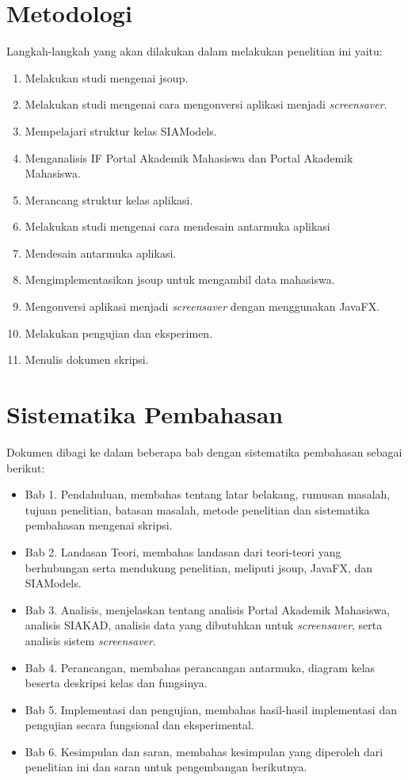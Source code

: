 \section{Metodologi}
\label{sec:metlit}
Langkah-langkah yang akan dilakukan dalam melakukan penelitian ini yaitu:
	\begin{enumerate}
		\item Melakukan studi mengenai jsoup.
		\item Melakukan studi mengenai cara mengonversi aplikasi menjadi \textit{screensaver}.
		\item Mempelajari struktur kelas SIAModels.
		\item Menganalisis IF Portal Akademik Mahasiswa dan Portal Akademik Mahasiswa.
		\item Merancang struktur kelas aplikasi.
		\item Melakukan studi mengenai cara mendesain antarmuka aplikasi
	    \item Mendesain antarmuka aplikasi.
	    \item Mengimplementasikan jsoup untuk mengambil data mahasiswa.
        \item Mengonversi aplikasi menjadi \textit{screensaver} dengan menggunakan JavaFX. 
		\item Melakukan pengujian dan eksperimen.
		\item Menulis dokumen skripsi.
	\end{enumerate}

\section{Sistematika Pembahasan}
\label{sec:sispem}
Dokumen dibagi ke dalam beberapa bab dengan sistematika pembahasan sebagai berikut:
    \begin{itemize}
        \item Bab 1. Pendahuluan, membahas tentang latar belakang, rumusan masalah, tujuan penelitian, batasan masalah, metode penelitian dan sistematika pembahasan mengenai skripsi.
        \item Bab 2. Landasan Teori, membahas landasan dari teori-teori yang berhubungan serta mendukung penelitian, meliputi jsoup, JavaFX, dan SIAModels. 
        \item Bab 3. Analisis, menjelaskan tentang analisis Portal Akademik Mahasiswa, analisis SIAKAD, analisis data yang dibutuhkan untuk \textit{screensaver}, serta analisis sistem \textit{screensaver}.
        \item Bab 4. Perancangan, membahas perancangan antarmuka, diagram kelas beserta deskripsi kelas dan fungsinya.
        \item Bab 5. Implementasi dan pengujian, membahas hasil-hasil implementasi dan pengujian secara fungsional dan eksperimental.
        \item Bab 6. Kesimpulan dan saran, membahas kesimpulan yang diperoleh dari penelitian ini dan saran untuk pengembangan berikutnya.
    \end{itemize}